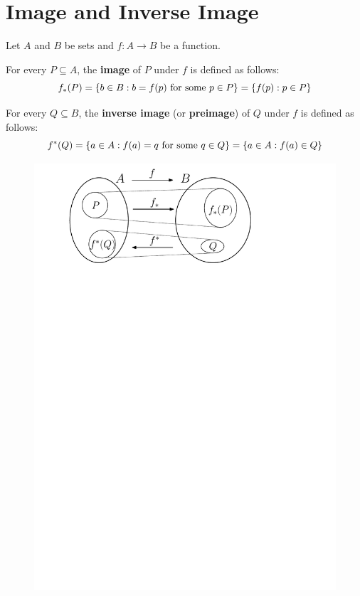 \documentclass[a4paper,english,12pt]{article}
\begin{document}
\section{Image and Inverse Image}
Let $A$ and $B$ be sets and $f:A\rightarrow B$ be a function. 
\begin{defn}[Image] For every $P\subseteq A$, the \textbf{image} of $P$ under $f$ is defined as follows:
\begin{equation*}
f_*(P)  =\{b\in B: b=f(p) \textnormal{ for some } p\in P\} =\{f(p):p\in P\}
\end{equation*}
\end{defn}

\begin{defn} For every $Q\subseteq B$, the \textbf{inverse image} (or \textbf{preimage}) of $Q$ under $f$ is defined as follows:
\begin{equation*}
f^*(Q)  =\{a\in A: f(a)=q \textnormal{ for some } q\in Q\} =\{a\in A:f(a)\in Q\}
\end{equation*}
\end{defn}

\begin{figure}[h]
\centering
\includegraphics[scale=0.6]{Figures/l5f1_img-invimg.pdf}
\caption{}
\end{figure}
\end{document}
